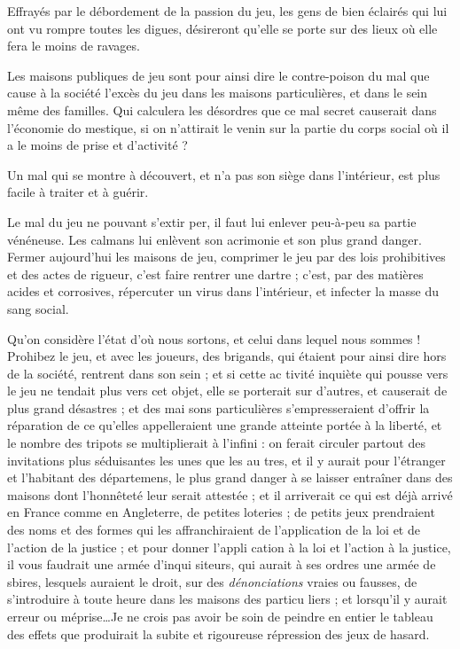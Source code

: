 Effrayés par le débordement de la
passion du jeu, les gens de bien 
éclairés qui lui ont vu rompre toutes
les digues, désireront qu'elle se porte
sur des lieux où elle fera le moins de
ravages.

Les maisons publiques de jeu sont
pour ainsi dire le contre-poison du
mal que cause à la société l'excès du
jeu dans les maisons particulières, et
dans le sein même des familles. Qui
calculera les désordres que ce mal
secret causerait dans l'économie do%
mestique, si on n'attirait le venin sur
la partie du corps social où il a le
moins de prise et d'activité ?

Un mal qui se montre à découvert,
et n'a pas son siège dans l'intérieur,
est plus facile à traiter et à guérir.

Le mal du jeu ne pouvant s'extir%
per, il faut lui enlever peu-à-peu sa
partie vénéneuse. Les calmans lui
enlèvent son acrimonie et son plus
grand danger. Fermer aujourd'hui
les maisons de jeu, comprimer le jeu
par des lois prohibitives et des actes
de rigueur, c'est faire rentrer une
dartre ; c'est, par des matières acides
et corrosives, répercuter un virus
dans l'intérieur, et infecter la masse
du sang social.

Qu'on considère l'état d'où nous
sortons, et celui dans lequel nous
sommes ! Prohibez le jeu, et avec les
joueurs, des brigands, qui étaient
pour ainsi dire hors de la société,
rentrent dans son sein ; et si cette ac%
tivité inquiète qui pousse vers le jeu
ne tendait plus vers cet objet, elle se
porterait sur d'autres, et causerait
de plus grand désastres ; et des mai%
sons particulières s'empresseraient
d'offrir la réparation de ce qu'elles
appelleraient une grande atteinte
portée à la liberté, et le nombre des
tripots se multiplierait à l'infini : on
ferait circuler partout des invitations
plus séduisantes les unes que les au%
tres, et il y aurait pour l'étranger et
l'habitant des départemens, le plus
grand danger à se laisser entraîner
dans des maisons dont l'honnêteté
leur serait attestée ; et il arriverait ce
qui est déjà arrivé en France comme
en Angleterre, de petites loteries ; de
petits jeux prendraient des noms et
des formes qui les affranchiraient de
l'application de la loi et de l'action
de la justice ; et pour donner l'appli%
cation à la loi et l'action à la justice,
il vous faudrait une armée d'inqui%
siteurs, qui aurait à ses ordres une
armée de sbires, lesquels auraient
le droit, sur des \emph{dénonciations} vraies
ou fausses, de s'introduire à toute
heure dans les maisons des particu%
liers ; et lorsqu'il y aurait erreur ou
méprise\ldots Je ne crois pas avoir be%
soin de peindre en entier le tableau
des effets que produirait la subite
et rigoureuse répression des jeux de
hasard.

